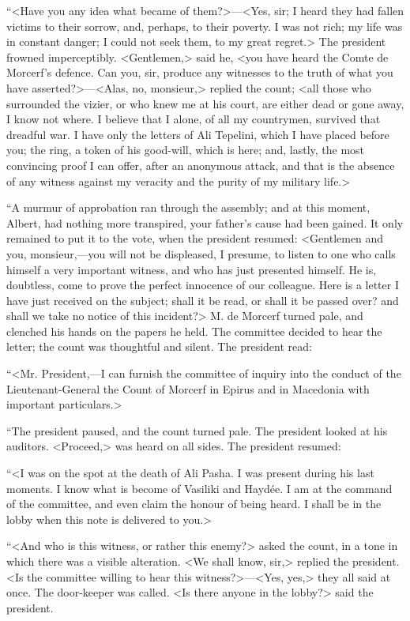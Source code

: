  “<Have you any idea what became of them?>—<Yes, sir; I heard they had fallen victims to their sorrow, and, perhaps, to their poverty. I was not rich; my life was in constant danger; I could not seek them, to my great regret.> The president frowned imperceptibly. <Gentlemen,> said he, <you have heard the Comte de Morcerf's defence. Can you, sir, produce any witnesses to the truth of what you have asserted?>—<Alas, no, monsieur,> replied the count; <all those who surrounded the vizier, or who knew me at his court, are either dead or gone away, I know not where. I believe that I alone, of all my countrymen, survived that dreadful war. I have only the letters of Ali Tepelini, which I have placed before you; the ring, a token of his good-will, which is here; and, lastly, the most convincing proof I can offer, after an anonymous attack, and that is the absence of any witness against my veracity and the purity of my military life.> 

 “A murmur of approbation ran through the assembly; and at this moment, Albert, had nothing more transpired, your father's cause had been gained. It only remained to put it to the vote, when the president resumed: <Gentlemen and you, monsieur,—you will not be displeased, I presume, to listen to one who calls himself a very important witness, and who has just presented himself. He is, doubtless, come to prove the perfect innocence of our colleague. Here is a letter I have just received on the subject; shall it be read, or shall it be passed over? and shall we take no notice of this incident?> M. de Morcerf turned pale, and clenched his hands on the papers he held. The committee decided to hear the letter; the count was thoughtful and silent. The president read: 

 “<Mr. President,—I can furnish the committee of inquiry into the conduct of the Lieutenant-General the Count of Morcerf in Epirus and in Macedonia with important particulars.> 

 “The president paused, and the count turned pale. The president looked at his auditors. <Proceed,> was heard on all sides. The president resumed: 

 “<I was on the spot at the death of Ali Pasha. I was present during his last moments. I know what is become of Vasiliki and Haydée. I am at the command of the committee, and even claim the honour of being heard. I shall be in the lobby when this note is delivered to you.> 

 “<And who is this witness, or rather this enemy?> asked the count, in a tone in which there was a visible alteration. <We shall know, sir,> replied the president. <Is the committee willing to hear this witness?>—<Yes, yes,> they all said at once. The door-keeper was called. <Is there anyone in the lobby?> said the president. 

